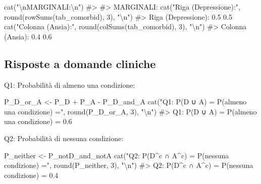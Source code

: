 \documentclass[
  letterpaper,
  DIV=11,
  numbers=noendperiod,
  oneside]{scrreprt}
\newenvironment{Shaded}{\begin{snugshade}}{\end{snugshade}}
\newcommand{\CommentTok}[1]{\textcolor[rgb]{0.37,0.37,0.37}{#1}}
\newcommand{\DecValTok}[1]{\textcolor[rgb]{0.68,0.00,0.00}{#1}}
\newcommand{\FunctionTok}[1]{\textcolor[rgb]{0.28,0.35,0.67}{#1}}
\newcommand{\NormalTok}[1]{\textcolor[rgb]{0.00,0.23,0.31}{#1}}
\newcommand{\OtherTok}[1]{\textcolor[rgb]{0.00,0.23,0.31}{#1}}
\newcommand{\SpecialCharTok}[1]{\textcolor[rgb]{0.37,0.37,0.37}{#1}}
\newcommand{\StringTok}[1]{\textcolor[rgb]{0.13,0.47,0.30}{#1}}
\theoremstyle{definition}
\theoremstyle{plain}
\theoremstyle{definition}
\theoremstyle{remark}
\begin{document}
\begin{Shaded}
\begin{Highlighting}[]
\FunctionTok{cat}\NormalTok{(}\StringTok{"}\SpecialCharTok{\textbackslash{}n}\StringTok{MARGINALI:}\SpecialCharTok{\textbackslash{}n}\StringTok{"}\NormalTok{)}
\CommentTok{\#\textgreater{} }
\CommentTok{\#\textgreater{} MARGINALI:}
\FunctionTok{cat}\NormalTok{(}\StringTok{"Riga (Depressione):"}\NormalTok{, }\FunctionTok{round}\NormalTok{(}\FunctionTok{rowSums}\NormalTok{(tab\_comorbid), }\DecValTok{3}\NormalTok{), }\StringTok{"}\SpecialCharTok{\textbackslash{}n}\StringTok{"}\NormalTok{)}
\CommentTok{\#\textgreater{} Riga (Depressione): 0.5 0.5}
\FunctionTok{cat}\NormalTok{(}\StringTok{"Colonna (Ansia):"}\NormalTok{, }\FunctionTok{round}\NormalTok{(}\FunctionTok{colSums}\NormalTok{(tab\_comorbid), }\DecValTok{3}\NormalTok{), }\StringTok{"}\SpecialCharTok{\textbackslash{}n}\StringTok{"}\NormalTok{)}
\CommentTok{\#\textgreater{} Colonna (Ansia): 0.4 0.6}
\end{Highlighting}
\end{Shaded}

\subsection{Risposte a domande
cliniche}\label{risposte-a-domande-cliniche}

Q1: Probabilità di almeno una condizione:

\begin{Shaded}
\begin{Highlighting}[]
\NormalTok{P\_D\_or\_A }\OtherTok{\textless{}{-}}\NormalTok{ P\_D }\SpecialCharTok{+}\NormalTok{ P\_A }\SpecialCharTok{{-}}\NormalTok{ P\_D\_and\_A}
\FunctionTok{cat}\NormalTok{(}\StringTok{"Q1: P(D ∪ A) = P(almeno una condizione) ="}\NormalTok{, }\FunctionTok{round}\NormalTok{(P\_D\_or\_A, }\DecValTok{3}\NormalTok{), }\StringTok{"}\SpecialCharTok{\textbackslash{}n}\StringTok{"}\NormalTok{)}
\CommentTok{\#\textgreater{} Q1: P(D ∪ A) = P(almeno una condizione) = 0.6}
\end{Highlighting}
\end{Shaded}

Q2: Probabilità di nessuna condizione:

\begin{Shaded}
\begin{Highlighting}[]
\NormalTok{P\_neither }\OtherTok{\textless{}{-}}\NormalTok{ P\_notD\_and\_notA}
\FunctionTok{cat}\NormalTok{(}\StringTok{"Q2: P(D\^{}c ∩ A\^{}c) = P(nessuna condizione) ="}\NormalTok{, }\FunctionTok{round}\NormalTok{(P\_neither, }\DecValTok{3}\NormalTok{), }\StringTok{"}\SpecialCharTok{\textbackslash{}n}\StringTok{"}\NormalTok{)}
\CommentTok{\#\textgreater{} Q2: P(D\^{}c ∩ A\^{}c) = P(nessuna condizione) = 0.4}
\end{Highlighting}
\end{Shaded}
\end{document}
